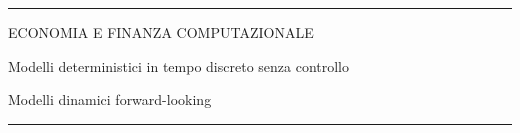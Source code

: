 \documentclass[12pt,aspectratio=169]{beamer}
\begin{document}
\begin{frame}
\unitlength 5mm

\begin{center}

\rule{\textwidth}{2pt}

\vskip3mm
ECONOMIA E FINANZA COMPUTAZIONALE

Modelli deterministici in tempo discreto senza controllo

Modelli dinamici forward-looking
\rule{\textwidth}{2pt}

\end{center}

\end{frame}


\end{document}

